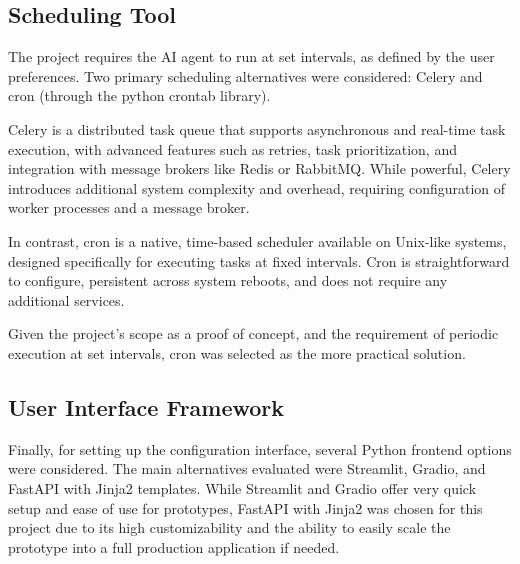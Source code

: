 \documentclass[a4paper]{report}
\begin{document}
\subsection{Scheduling Tool}

The project requires the AI agent to run at set intervals, as defined by the user preferences. Two primary scheduling alternatives were considered: Celery and cron (through the python crontab library).

Celery is a distributed task queue that supports asynchronous and real-time task execution, with advanced features such as retries, task prioritization, and integration with message brokers like Redis or RabbitMQ. While powerful, Celery introduces additional system complexity and overhead, requiring configuration of worker processes and a message broker.

In contrast, cron is a native, time-based scheduler available on Unix-like systems, designed specifically for executing tasks at fixed intervals. Cron is straightforward to configure, persistent across system reboots, and does not require any additional services.

Given the project's scope as a proof of concept, and the requirement of periodic execution at set intervals, cron was selected as the more practical solution.

\subsection{User Interface Framework}

Finally, for setting up the configuration interface, several Python frontend options were considered. The main alternatives evaluated were Streamlit, Gradio, and FastAPI with Jinja2 templates. While Streamlit and Gradio offer very quick setup and ease of use for prototypes, FastAPI with Jinja2 was chosen for this project due to its high customizability and the ability to easily scale the prototype into a full production application if needed.
\end{document}
